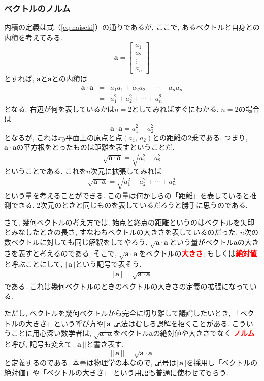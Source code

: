 \subsubsection{ベクトルのノルム}
内積の定義は式（\ref{eq:naiseki}）の通りであるが, ここで, あるベクトルと自身との内積を考えてみる. 
$$
\bm{a} = \left[
 \begin{array}{c}
  a_1 \\
  a_2 \\
  \vdots \\
  a_n
 \end{array}
 \right]
$$
とすれば, $\bm{a}$と$\bm{a}$との内積は
\begin{eqnarray*}
\bm{a} \cdot \bm{a} & = & a_1 a_1 + a_2 a_2 + \cdots + a_n a_n \\
& = & a_1^2+a_2^2+\cdots+a_n^2
\end{eqnarray*}
となる. 右辺が何を表しているかは$n=2$としてみればすぐにわかる. 
$n=2$の場合は
$$
\bm{a} \cdot \bm{a} = a_1^2 + a_2^2
$$
となるが, これは$xy$平面上の原点と点$(a_1, \, a_2)$との距離の2乗である. 
つまり, $\bm{a} \cdot \bm{a}$の平方根をとったものは距離を表すということだ. 
$$
\sqrt{\bm{a}\cdot\bm{a}} = \sqrt{a_1^2 + a_2^2} 
$$
ということである. これを$n$次元に拡張してみれば
$$
\sqrt{\bm{a}\cdot\bm{a}} = \sqrt{a_1^2 + a_2^2+\cdots + a_n^2}
$$
という量を考えることができる. 
この量は何かしらの「距離」を表していると推測できる. 2次元のときと同じものを表しているだろうと勝手に思うのである. 

さて, 幾何ベクトルの考え方では, 始点と終点の距離というのはベクトルを矢印とみなしたときの長さ, 
すなわちベクトルの大きさを表しているのだった. 
$n$次の数ベクトルに対しても同じ解釈をしてやろう. 
$\sqrt{\bm{a}\cdot\bm{a}}$という量がベクトル$\bm{a}$の大きさを表すと考えるのである. 
そこで, $\sqrt{\bm{a}\cdot\bm{a}}$をベクトルの\textbf{\textcolor{red}{大きさ}}, 
もしくは\textbf{\textcolor{red}{絶対値}}と呼ぶことにして, $| \, \bm{a} \, |$という記号で表そう. 
\begin{eqnarray}
| \, \bm{a} \, | = \sqrt{\bm{a}\cdot\bm{a}}
\label{eq:vecabs}
\end{eqnarray}
である. これは幾何ベクトルのときのベクトルの大きさの定義の拡張になっている. 

ただし, ベクトルを幾何ベクトルから完全に切り離して議論したいとき, 
「ベクトルの大きさ」という呼び方や$| \, \bm{a} \, |$記法はむしろ誤解を招くことがある. 
こういうことに用心深い数学者は, $\sqrt{\bm{a}\cdot\bm{a}}$をベクトル$\bm{a}$の絶対値や大きさでなく
\textbf{\textcolor{red}{ノルム}}と呼び, 記号も変えて$|| \, \bm{a} \, ||$と書き表す. 
$$
|| \, \bm{a} \, || = \sqrt{\bm{a}\cdot\bm{a}}
$$
と定義するのである. 本書は物理学の本なので, 記号は$| \, \bm{a} \, |$を採用し「ベクトルの絶対値」や「ベクトルの大きさ」
という用語も普通に使わせてもらう. 

